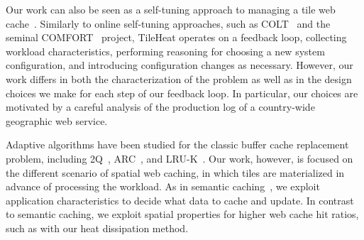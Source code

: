 \documentclass[11pt, oneside]{report}
\begin{document}
{Our work can also be seen as a self-tuning approach to managing a tile web cache~\cite{surajit2007selftuning}. Similarly to online self-tuning approaches, such as COLT~\cite{schnaitter2007indexselection} and the seminal COMFORT~\cite{weikum1994comfort} project, TileHeat operates on a feedback loop, collecting workload characteristics, performing reasoning for choosing a new system configuration, and introducing configuration changes as necessary. However, our work differs in both the characterization of the problem as well as in the design choices we make for each step of our feedback loop. 
In particular, our choices are motivated by a careful analysis of the production log of a country-wide geographic web service. 

Adaptive algorithms have been studied for the classic buffer cache replacement problem, including 2Q~\cite{johnson1994twoq}, ARC~\cite{megiddo2003arc}, and LRU-K~\cite{oneil1993lruk}. Our work, however, is focused on the different scenario of spatial web caching, in which tiles are materialized in advance of processing the workload.
As in semantic caching~\cite{dar1996semantic}, we exploit application characteristics to decide what data to cache and update. In contrast to semantic caching, we exploit spatial properties for higher web cache hit ratios, such as with our heat dissipation method. 
	
}
\end{document}
